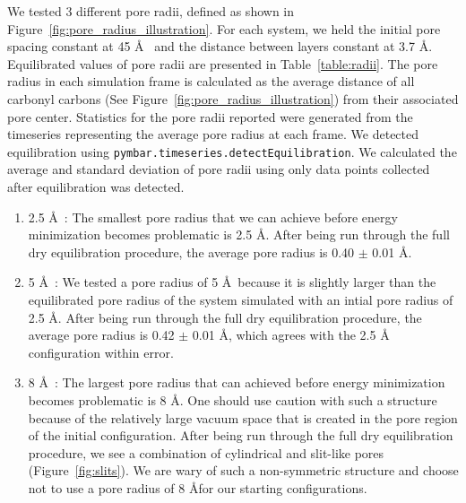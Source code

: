 \documentclass{article}
\begin{document}
\begin{enumerate}
	  We tested 3 different pore radii, defined as shown in
	  Figure~\ref{fig:pore_radius_illustration}. For each system, we held the initial
	  pore spacing constant at 45 \AA~ and the distance between layers constant at
	  3.7 \AA. Equilibrated values of pore radii are presented in
	  Table~\ref{table:radii}. The pore radius in each simulation frame is calculated as the
	  average distance of all carbonyl carbons (See
	  Figure~\ref{fig:pore_radius_illustration}) from their associated pore center.
	  Statistics for the pore radii reported were generated from the timeseries
	  representing the average pore radius at each frame.  We detected equilibration 
	  using \texttt{pymbar.timeseries.detectEquilibration}. We calculated the average
	  and standard deviation of pore radii using only data points collected after
	  equilibration was detected.

	  \begin{enumerate}

		\item 2.5 \AA~: The smallest pore radius that we can achieve
		before energy minimization becomes problematic is 2.5 \AA. After being run
		through the full dry equilibration procedure, the average pore radius is 0.40
		$\pm$ 0.01 \AA.

		\item 5 \AA~: We tested a pore radius of 5 \AA~because it is
		slightly larger than the equilibrated pore radius of the system simulated with
		an intial pore radius of 2.5 \AA. After being run through the full dry
		equilibration procedure, the average pore radius is 0.42 $\pm$ 0.01 \AA, which
		agrees with the 2.5 \AA~ configuration within error. 

		\item 8 \AA~: The largest pore radius that can achieved before
		energy minimization becomes problematic is 8 \AA. One should use caution with
		such a structure because of the relatively large vacuum space that is created
		in the pore region of the initial configuration. After being run through the
		full dry equilibration procedure, we see a combination of cylindrical and
		slit-like pores (Figure~\ref{fig:slits}). We are wary of such a non-symmetric
		structure and choose not to use a pore radius of 8 \AA for our starting configurations. 
	  
	  \end{enumerate}


\end{enumerate}
\end{document}
